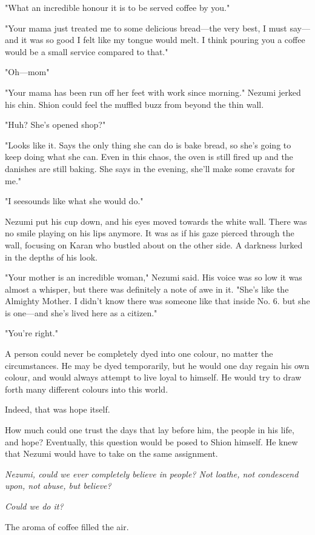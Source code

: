 "What an incredible honour it is to be served coffee by you."

"Your mama just treated me to some delicious bread---the very best, I must
say---and it was so good I felt like my tongue would melt. I think pouring
you a coffee would be a small service compared to that."

"Oh---mom\el "

"Your mama has been run off her feet with work since morning." Nezumi
jerked his chin. Shion could feel the muffled buzz from beyond the thin
wall.

"Huh? She's opened shop?"

"Looks like it. Says the only thing she can do is bake bread, so she's
going to keep doing what she can. Even in this chaos, the oven is still
fired up and the danishes are still baking. She says in the evening,
she'll make some cravats for me."

"I see\el sounds like what she would do."

Nezumi put his cup down, and his eyes moved towards the white wall.
There was no smile playing on his lips anymore. It was as if his gaze
pierced through the wall, focusing on Karan who bustled about on the
other side. A darkness lurked in the depths of his look.

"Your mother is an incredible woman," Nezumi said. His voice was so low
it was almost a whisper, but there was definitely a note of awe in it.
"She's like the Almighty Mother. I didn't know there was someone like
that inside No. 6. but she is one---and she's lived here as a citizen."

"\el You're right."

A person could never be completely dyed into one colour, no matter the
circumstances. He may be dyed temporarily, but he would one day regain
his own colour, and would always attempt to live loyal to himself. He
would try to draw forth many different colours into this world.

Indeed, that was hope itself.

How much could one trust the days that lay before him, the people in his
life, and hope? Eventually, this question would be posed to Shion
himself. He knew that Nezumi would have to take on the same assignment.

\emph{Nezumi, could we ever completely believe in people? Not loathe, not
condescend upon, not abuse, but believe?}

\emph{Could we do it?}

The aroma of coffee filled the air.

